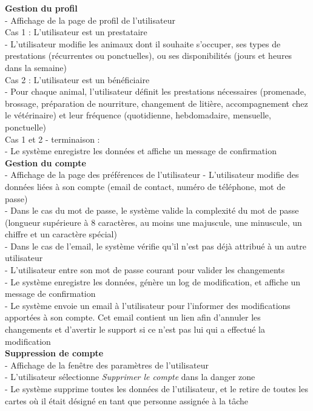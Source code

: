 \documentclass[conference]{IEEEtran}
\begin{document}
\textbf{Gestion du profil}\\
- Affichage de la page de profil de l'utilisateur\\

Cas 1 : L'utilisateur est un prestataire\\
- L'utilisateur modifie les animaux dont il souhaite s'occuper, ses types de prestations (récurrentes ou ponctuelles), ou ses disponibilités (jours et heures dans la semaine)\\

Cas 2 : L'utilisateur est un bénéficiaire\\
- Pour chaque animal, l'utilisateur définit les prestations nécessaires (promenade, brossage, préparation de nourriture, changement de litière, accompagnement chez le vétérinaire) et leur fréquence (quotidienne, hebdomadaire, mensuelle, ponctuelle)\\

Cas 1 et 2 - terminaison :\\
- Le système enregistre les données et affiche un message de confirmation\\

\textbf{Gestion du compte}\\
- Affichage de la page des préférences de l'utilisateur
- L'utilisateur modifie des données liées à son compte (email de contact, numéro de téléphone, mot de passe)\\
- Dans le cas du mot de passe, le système valide la complexité du mot de passe (longueur supérieure à 8 caractères, au moins une majuscule, une minuscule, un chiffre et un caractère spécial)\\
- Dans le cas de l'email, le système vérifie qu'il n'est pas déjà attribué à un autre utilisateur\\
- L'utilisateur entre son mot de passe courant pour valider les changements\\
- Le système enregistre les données, génère un log de modification, et affiche un message de confirmation\\
- Le système envoie un email à l'utilisateur pour l'informer des modifications apportées à son compte. Cet email contient un lien afin d'annuler les changements et d'avertir le support si ce n'est pas lui qui a effectué la modification\\

\textbf{Suppression de compte}\\
- Affichage de la fenêtre des paramètres de l'utilisateur\\
- L'utilisateur sélectionne \textit{Supprimer le compte} dans la danger zone\\
- Le système supprime toutes les données de l'utilisateur, et le retire de toutes les cartes où il était désigné en tant que personne assignée à la tâche\\
\end{document}
